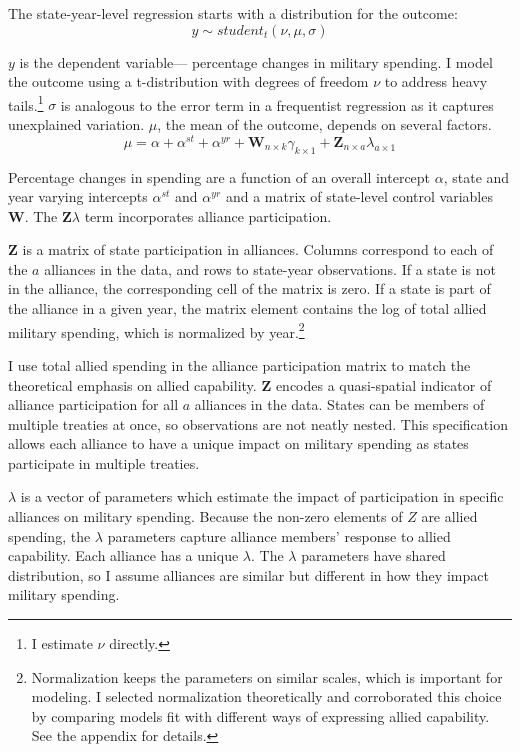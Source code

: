 \documentclass[12pt]{article}
\begin{document}
The state-year-level regression starts with a distribution for the outcome:
\begin{equation}
y \sim student_t(\nu, \mu, \sigma)
\end{equation}
 

$y$ is the dependent variable--- percentage changes in military spending. 
I model the outcome using a t-distribution with degrees of freedom $\nu$ to address heavy tails.\footnote{I estimate $\nu$ directly.}
$\sigma$ is analogous to the error term in a frequentist regression as it captures unexplained variation.  
$\mu$, the mean of the outcome, depends on several factors.
\begin{equation}
\mu = \alpha + \alpha^{st} + \alpha^{yr} +\textbf{W}_{n \times k} \gamma_{k \times 1}  + \textbf{Z}_{n \times a} \lambda_{a \times 1} 
\end{equation}


Percentage changes in spending are a function of an overall intercept $\alpha$, state and year varying intercepts $\alpha^{st}$ and $\alpha^{yr}$ and a matrix of state-level control variables $\textbf{W}$.
The $\textbf{Z} \lambda$ term incorporates alliance participation.


$\textbf{Z}$ is a matrix of state participation in alliances. 
Columns correspond to each of the $a$ alliances in the data, and rows to state-year observations. 
If a state is not in the alliance, the corresponding cell of the matrix is zero.
If a state is part of the alliance in a given year, the matrix element contains the log of total allied military spending, which is normalized by year.\footnote{Normalization keeps the parameters on similar scales, which is important for modeling. I selected normalization theoretically and corroborated this choice by comparing models fit with different ways of expressing allied capability. See the appendix for details.} 


I use total allied spending in the alliance participation matrix to match the theoretical emphasis on allied capability. 
$\textbf{Z}$ encodes a quasi-spatial indicator of alliance participation for all $a$ alliances in the data. 
States can be members of multiple treaties at once, so observations are not neatly nested. 
This specification allows each alliance to have a unique impact on military spending as states participate in multiple treaties. 


$\lambda$ is a vector of parameters which estimate the impact of participation in specific alliances on military spending. 
Because the non-zero elements of $Z$ are allied spending, the $\lambda$ parameters capture alliance members' response to allied capability. 
Each alliance has a unique $\lambda$. 
The $\lambda$ parameters have shared distribution, so I assume alliances are similar but different in how they impact military spending. 
\end{document}
